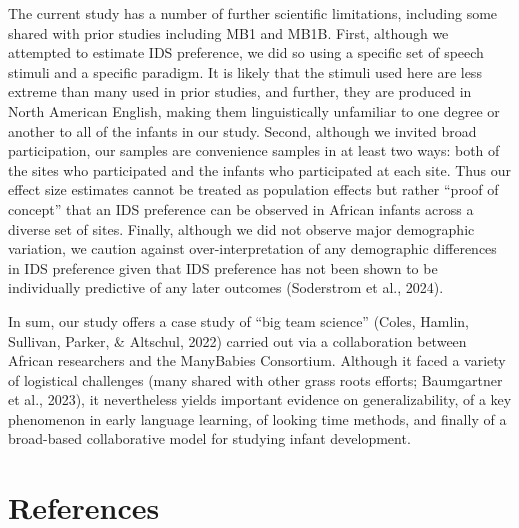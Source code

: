 \documentclass[
  ,man,floatsintext]{apa6}
\begin{document}
The current study has a number of further scientific limitations, including some shared with prior studies including MB1 and MB1B. First, although we attempted to estimate IDS preference, we did so using a specific set of speech stimuli and a specific paradigm. It is likely that the stimuli used here are less extreme than many used in prior studies, and further, they are produced in North American English, making them linguistically unfamiliar to one degree or another to all of the infants in our study. Second, although we invited broad participation, our samples are convenience samples in at least two ways: both of the sites who participated and the infants who participated at each site. Thus our effect size estimates cannot be treated as population effects but rather ``proof of concept'' that an IDS preference can be observed in African infants across a diverse set of sites. Finally, although we did not observe major demographic variation, we caution against over-interpretation of any demographic differences in IDS preference given that IDS preference has not been shown to be individually predictive of any later outcomes (Soderstrom et al., 2024).

In sum, our study offers a case study of ``big team science'' (Coles, Hamlin, Sullivan, Parker, \& Altschul, 2022) carried out via a collaboration between African researchers and the ManyBabies Consortium. Although it faced a variety of logistical challenges (many shared with other grass roots efforts; Baumgartner et al., 2023), it nevertheless yields important evidence on generalizability, of a key phenomenon in early language learning, of looking time methods, and finally of a broad-based collaborative model for studying infant development.

\newpage

\hypertarget{references}{%
\section{References}\label{references}}

\begingroup
\setlength{\parindent}{-0.5in}
\setlength{\leftskip}{0.5in}
\end{document}
